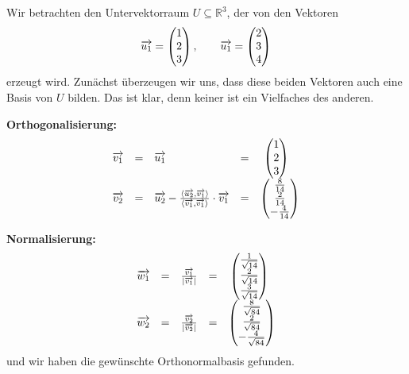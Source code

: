 \begin{beispiel} Wir betrachten den Untervektorraum $U \subseteq \mathbb R^3$, der von den Vektoren 
  	$$ \overrightarrow{u_1} = \left( \begin{matrix} 1 \\ 2 \\ 3 \end{matrix} \right), \qquad 
   	\overrightarrow{u_1} = \left( \begin{matrix} 2 \\ 3 \\ 4 \end{matrix} \right) $$
erzeugt wird. Zunächst überzeugen wir uns, dass diese beiden Vektoren auch eine Basis von $U$ bilden. 
Das ist klar, denn keiner ist ein Vielfaches des anderen. 

\textbf{Orthogonalisierung:}
  	$$ \begin{array}{l c l c l }
   	\overrightarrow{v_1} & = & \overrightarrow{u_1} & = & \, \, \left( \begin{matrix} 1 \\ 2 \\ 3 \end{matrix} 
	\right) \\
   	\overrightarrow{v_2} & = & \overrightarrow{u_2} - \frac {\langle \overrightarrow{u_2}, 
   	\overrightarrow{v_1}\rangle}{ \langle \overrightarrow{v_1}, \overrightarrow{v_1}\rangle} \cdot 
   	\overrightarrow{v_1} & = & \left( \begin{matrix} \frac {8}{14} \\ \frac {2}{14} \\ -\frac {4}{14} 
	\end{matrix}  \right)  
  	\end{array} $$

\textbf{Normalisierung:}
  	$$ \begin{array}{l c l c l}
  	\overrightarrow{w_1} & = & \frac {\overrightarrow{v_1}}{\vert \overrightarrow{v_1} \vert}
    	& = & \, \left( \begin{matrix} \frac {1}{\sqrt{14}} \\ \frac {2}{\sqrt{14}} \\ \frac {3}{\sqrt{14}} 
	\end{matrix}  \right) \\
  	\overrightarrow{w_2} & = & \frac {\overrightarrow{v_2}}{\vert \overrightarrow{v_2} \vert}
    	& = & \left( \begin{matrix} \frac {8}{\sqrt{84}} \\ \frac {2}{\sqrt{84}} \\ -\frac {4}{\sqrt{84}} 
	\end{matrix}  \right)  
  	\end{array} $$
und wir haben die gewünschte Orthonormalbasis gefunden.
\end{beispiel}


